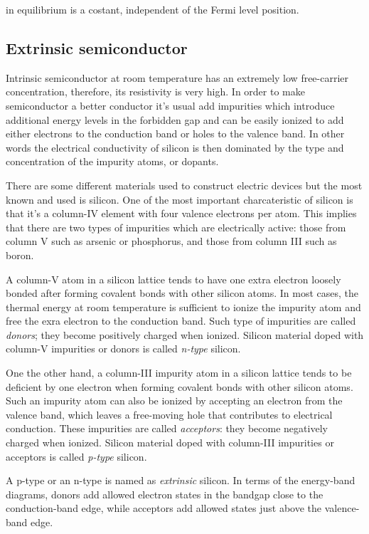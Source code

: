 in equilibrium is a costant, independent of the Fermi level position.


\subsection{Extrinsic semiconductor}
Intrinsic semiconductor at room temperature has an extremely low free-carrier concentration, therefore, its resistivity is very high. In order to make semiconductor a better conductor it's usual add impurities which introduce additional energy levels in the forbidden gap and can be easily ionized to add either electrons to the conduction band or holes to the valence band. In other words the electrical conductivity of silicon is then dominated by the type and concentration of the impurity atoms, or dopants.

There are some different materials used to construct electric devices but the most known and used is silicon. One of the most important charcateristic of silicon is that it's a column-IV element with four valence electrons per atom. This implies that there are two types of impurities which are electrically active: those from column V such as arsenic or phosphorus, and those from column III such as boron.

A column-V atom in a silicon lattice tends to have one extra electron loosely bonded after forming covalent bonds with other silicon atoms. In most cases, the thermal energy at room temperature is sufficient to ionize the impurity atom and free the exra electron to the conduction band. Such type of impurities are called \textit{donors}; they become positively charged when ionized. Silicon material doped with column-V impurities or donors is called \textit{n-type} silicon.

One the other hand, a column-III impurity atom in a silicon lattice tends to be deficient by one electron when forming covalent bonds with other silicon atoms. Such an impurity atom can also be ionized by accepting an electron from the valence band, which leaves a free-moving hole that contributes to electrical conduction. These impurities are called \textit{acceptors}: they become negatively charged when ionized. Silicon material doped with column-III impurities or acceptors is called \textit{p-type} silicon.

A p-type or an n-type is named as \textit{extrinsic} silicon.
In terms of the energy-band diagrams, donors add allowed electron states in the bandgap close to the conduction-band edge, while acceptors add allowed states just above the valence-band edge.

